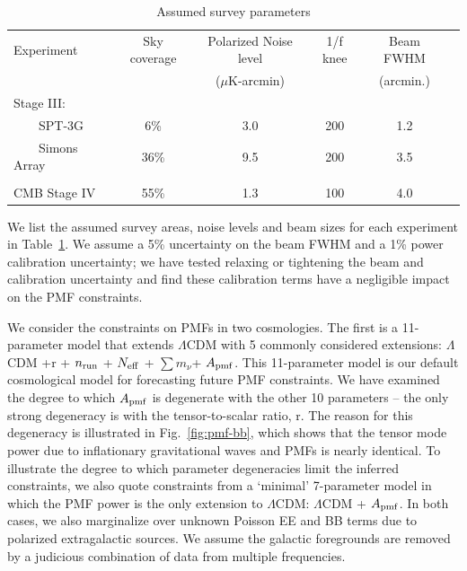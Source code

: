 \documentclass[apj]{emulateapj}
\newcommand{\apmf}{\ensuremath{A_{\rm pmf}}}
\newcommand{\lcdm}{\ensuremath{\Lambda}CDM}
\newcommand{\nrun}{\ensuremath{n_{\rm run}}}
\newcommand{\neff}{\ensuremath{N_{\rm eff}}}
\newcommand{\mnu}{\ensuremath{\sum m_\nu}}
\begin{document}
\begin{table}[tbh]
\begin{center}
\caption{\label{tab:experiments} Assumed survey parameters}
\small
\begin{tabular}{l || c c c c c }
Experiment & Sky coverage & Polarized Noise level  & 1/f knee & Beam FWHM \\
& &($\mu$K-arcmin)&&(arcmin.)\\
\hline
Stage III: & & & & \\

~~~~SPT-3G & 6\% & 3.0 & 200 & 1.2 \\
~~~~Simons Array & 36\% & 9.5 & 200 & 3.5 \\ 
\\
CMB Stage IV & 55\% & 1.3 & 100 & 4.0 \\
\end{tabular}
 \normalsize
\end{center}
\end{table}


We list the assumed survey areas, noise levels and beam sizes for each experiment in Table~\ref{tab:experiments}. 
We  assume a 5\% uncertainty on the beam FWHM and a 1\% power calibration uncertainty; we have tested relaxing or tightening the beam and calibration uncertainty and find these calibration terms have a negligible impact on the PMF constraints. 


We consider the constraints on PMFs in two cosmologies. 
The first is a 11-parameter model that extends \lcdm{} with 5 commonly considered extensions:  \lcdm{}  +r + \nrun{} + \neff{} + \mnu{}+ \apmf. 
This 11-parameter model is our default cosmological model for forecasting future PMF constraints. 
We have examined the degree to which \apmf{} is degenerate with the other 10 parameters -- the only strong degeneracy is with the tensor-to-scalar ratio, r. 
The reason for this degeneracy is illustrated in Fig.~\ref{fig:pmf-bb}, which shows that the tensor mode power due to inflationary gravitational waves and PMFs is nearly identical. 
To illustrate the degree to which parameter degeneracies limit the inferred constraints,  we also quote constraints from a `minimal' 7-parameter model in which the PMF power is the only extension to \lcdm{}:  \lcdm{}  + \apmf. 
In both cases, we also marginalize over unknown Poisson EE and BB  terms due to polarized extragalactic sources. 
We assume the galactic foregrounds are removed by a judicious combination of data from multiple frequencies. 
\end{document}
